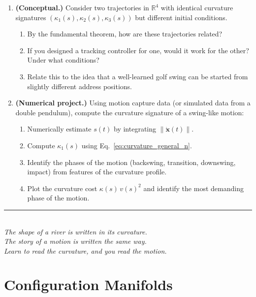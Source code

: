 \documentclass[12pt, openany]{book}
\theoremstyle{plain}
\newcommand{\state}{\bm{x}}
\newcommand{\Reals}{\mathbb{R}}
\newcommand{\norm}[1]{\left\lVert #1 \right\rVert}
\begin{document}
\begin{enumerate}[label=\textbf{2.\arabic*.}, leftmargin=1.5cm]
\item \textbf{(Conceptual.)} Consider two trajectories in $\Reals^4$ with
  identical curvature signatures $(\kappa_1(s), \kappa_2(s), \kappa_3(s))$
  but different initial conditions.
  \begin{enumerate}[label=(\alph*)]
    \item By the fundamental theorem, how are these trajectories related?
    \item If you designed a tracking controller for one, would it work for the
      other? Under what conditions?
    \item Relate this to the idea that a well-learned golf swing can be started
      from slightly different address positions.
  \end{enumerate}

\item \textbf{(Numerical project.)} Using motion capture data (or simulated data
  from a double pendulum), compute the curvature signature of a swing-like motion:
  \begin{enumerate}[label=(\alph*)]
    \item Numerically estimate $s(t)$ by integrating $\norm{\dot{\state}(t)}$.
    \item Compute $\kappa_1(s)$ using Eq.~\eqref{eq:curvature_general_n}.
    \item Identify the phases of the motion (backswing, transition, downswing,
      impact) from features of the curvature profile.
    \item Plot the curvature cost $\kappa(s)\, v(s)^2$ and identify the most
      demanding phase of the motion.
  \end{enumerate}

\end{enumerate}

\vspace{1cm}
\begin{center}
  \rule{0.5\textwidth}{0.4pt}\\[0.5cm]
  {\small\itshape
  The shape of a river is written in its curvature.\\
  The story of a motion is written the same way.\\[0.3cm]
  Learn to read the curvature, and you read the motion.}
\end{center}

\chapter{Configuration Manifolds}
\end{document}
